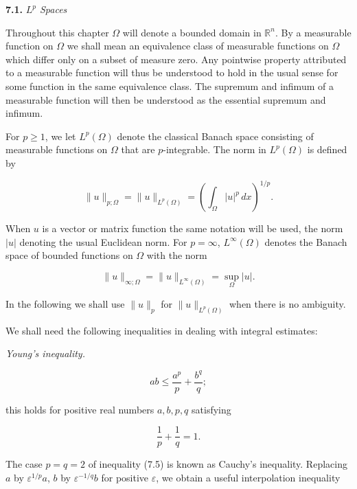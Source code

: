 

\noindent\textbf{7.1.} \textit{$L^p$ Spaces}\label{gt:sec-lp-spaces}

\medskip

Throughout this chapter $\Omega$ will denote a bounded domain in $\mathbb{R}^n$. By a measurable function on $\Omega$ we shall mean an equivalence class of measurable functions on $\Omega$ which differ only on a subset of measure zero. Any pointwise property attributed to a measurable function will thus be understood to hold in the usual sense for some function in the same equivalence class. The supremum and infimum of a measurable function will then be understood as the essential supremum and infimum.

For $p \geq 1$, we let $L^p(\Omega)$ denote the classical Banach space consisting of measurable functions on $\Omega$ that are $p$-integrable. The norm in $L^p(\Omega)$ is defined by

\begin{equation}
\tag{7.3}
\|u\|_{p;\Omega} = \|u\|_{L^p(\Omega)} = \left(\int_\Omega |u|^p\,dx\right)^{1/p}.
\end{equation}

When $u$ is a vector or matrix function the same notation will be used, the norm $|u|$ denoting the usual Euclidean norm. For $p=\infty$, $L^\infty(\Omega)$ denotes the Banach space of bounded functions on $\Omega$ with the norm

\begin{equation}
\tag{7.4}
\|u\|_{\infty;\Omega} = \|u\|_{L^\infty(\Omega)} = \sup_\Omega |u|.
\end{equation}

In the following we shall use $\|u\|_p$ for $\|u\|_{L^p(\Omega)}$ when there is no ambiguity.

We shall need the following inequalities in dealing with integral estimates:

\textit{Young's inequality.}

\begin{equation}
\tag{7.5}
ab \leq \frac{a^p}{p} + \frac{b^q}{q};
\end{equation}

this holds for positive real numbers $a, b, p, q$ satisfying

\[
\frac{1}{p} + \frac{1}{q} = 1.
\]

The case $p=q=2$ of inequality (7.5) is known as Cauchy's inequality. Replacing $a$ by $\varepsilon^{1/p}a$, $b$ by $\varepsilon^{-1/q}b$ for positive $\varepsilon$, we obtain a useful interpolation inequality

